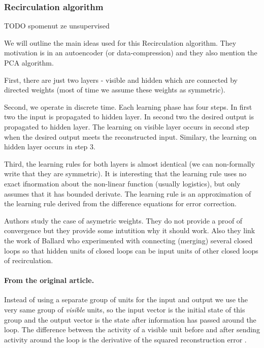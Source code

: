 \subsubsection{Recirculation algorithm}

TODO spomenut ze unsupervised 

We will outline the main ideas used for this Recirculation algorithm. They motivation is in an autoencoder (or data-compression) and they also mention the PCA algorithm. 

First, there are just two layers - visible and hidden which are connected by directed weights (most of time we assume these weights as symmetric). 

Second, we operate in discrete time. Each learning phase has four steps. In first two the input is propagated to hidden layer. In second two the desired output is propagated to hidden layer. The learning on visible layer occurs in second step when the desired output meets the reconstructed input. Similary, the learning on hidden layer occurs in step 3.

Third, the learning rules for both layers is almost identical (we can non-formally write that they are symmetric). It is interesting that the learning rule uses no exact ifnormation about the non-linear function (usually logistics), but only assumes that it has bounded derivate. The learning rule is an approximation of the learning rule derived from the difference equations for error correction. 

Authors study the case of asymetric weights. They do not provide a proof of convergence but they provide some intutition why it should work. Also they link the work of Ballard who experimented with connecting (merging) several closed loops so that hidden units of closed loops can be input units of other closed loops of recirculation.

\paragraph{From the original article.}
Instead of using a separate group of units for the input and output we use the very same group of \textit{visible} units, so the input vector is the initial state of this group and the output vector is the state after information has passed around the loop. The difference between the activity of a visible unit before and after sending activity around the loop is the derivative of the squared reconstruction error \citet{hinton1988learning}.

